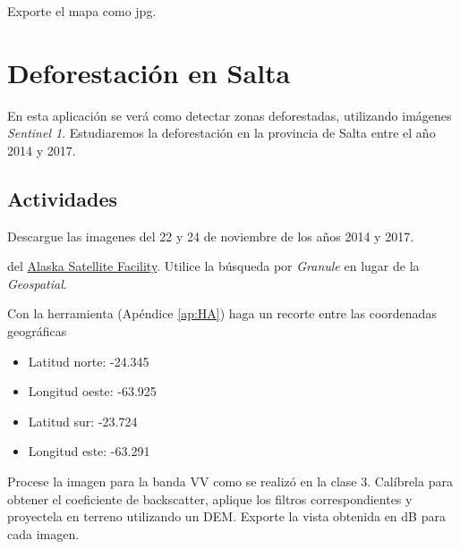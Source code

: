 \begin{que}
    Exporte el mapa como jpg.
\end{que}


\section{Deforestación en Salta}

En esta aplicación se verá como detectar zonas deforestadas, utilizando imágenes \emph{Sentinel 1}. Estudiaremos la deforestación en la provincia de Salta entre el año 2014 y 2017.


\subsection{Actividades}

\begin{que}
    Descargue las imagenes del 22 y 24 de noviembre de los años 2014 y 2017.
    \begin{center}\end{center}
      \begin{center}\end{center}
      del \href{https://vertex.daac.asf.alaska.edu/}{Alaska Satellite Facility}. Utilice la búsqueda por \emph{Granule} en lugar de la \emph{Geospatial}.
\end{que}

\begin{que}
    Con la herramienta  (Apéndice \ref{ap:HA}) haga un recorte entre las coordenadas geográficas
    \begin{itemize}
        \item Latitud norte: -24.345
        \item Longitud oeste: -63.925
        \item Latitud sur: -23.724
        \item Longitud este: -63.291
    \end{itemize}
\end{que}

\begin{que}
    Procese la imagen para la banda VV como se realizó en la clase 3. Calíbrela para obtener el coeficiente de backscatter, aplique los filtros correspondientes y proyectela en terreno utilizando un DEM. Exporte la vista obtenida en dB para cada imagen.
\end{que}

